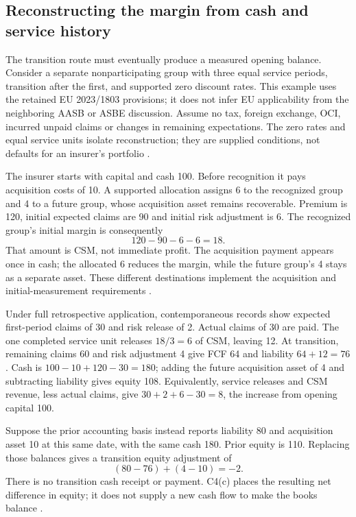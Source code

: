 \subsection{Reconstructing the margin from cash and service history}
\label{sec:insurance-retrospective-measurement}

The transition route must eventually produce a measured opening balance.
Consider a separate nonparticipating group with three equal service periods,
transition after the first, and supported zero discount rates. This example
uses the retained EU 2023/1803 provisions; it does not infer EU applicability
from the neighboring AASB or ASBE discussion. Assume no tax, foreign exchange,
OCI, incurred unpaid claims or changes in remaining expectations. The zero
rates and equal service units isolate reconstruction; they are supplied
conditions, not defaults for an insurer's portfolio
\citep[IFRS~17.C3--C8,44,B119]{eu20231803}.

The insurer starts with capital and cash 100. Before recognition it pays
acquisition costs of 10. A supported allocation assigns 6 to the recognized
group and 4 to a future group, whose acquisition asset remains recoverable.
Premium is 120, initial expected claims are 90 and initial risk adjustment
is 6. The recognized group's initial margin is consequently
\[
 120-90-6-6=18.
\]
That amount is CSM, not immediate profit. The acquisition payment appears once
in cash; the allocated 6 reduces the margin, while the future group's 4 stays
as a separate asset. These different destinations implement the acquisition
and initial-measurement requirements \citep[IFRS~17.28A--28F,38,C4]{eu20231803}.

Under full retrospective application, contemporaneous records show expected
first-period claims of 30 and risk release of 2. Actual claims of 30 are paid.
The one completed service unit releases \(18/3=6\) of CSM, leaving 12.
At transition, remaining claims 60 and risk adjustment 4 give FCF 64 and
liability \(64+12=76\). Cash is \(100-10+120-30=180\); adding the
future acquisition asset of 4 and subtracting liability gives equity 108.
Equivalently, service releases and CSM revenue, less actual claims, give
\(30+2+6-30=8\), the increase from opening capital 100.

Suppose the prior accounting basis instead reports liability 80 and acquisition
asset 10 at this same date, with the same cash 180. Prior equity is 110.
Replacing those balances gives a transition equity adjustment of
\[
 (80-76)+(4-10)=-2.
\]
There is no transition cash receipt or payment. C4(c) places the resulting net
difference in equity; it does not supply a new cash flow to make the books
balance \citep[IFRS~17.C4]{eu20231803}.

